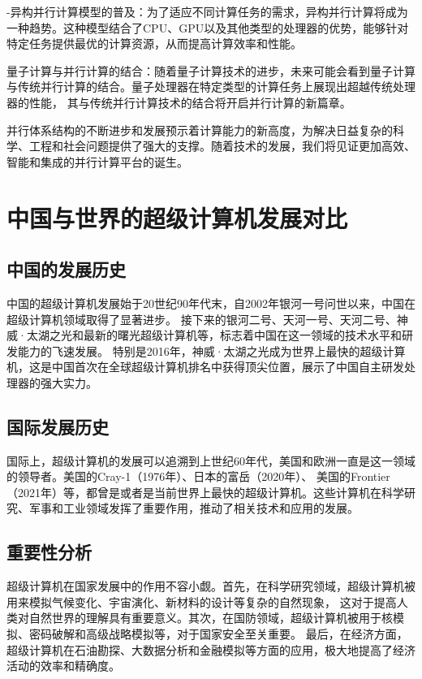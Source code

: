 \documentclass{ctexart}
\begin{document}
-异构并行计算模型的普及：为了适应不同计算任务的需求，异构并行计算将成为一种趋势。这种模型结合了CPU、GPU以及其他类型的处理器的优势，能够针对特定任务提供最优的计算资源，从而提高计算效率和性能。

量子计算与并行计算的结合：随着量子计算技术的进步，未来可能会看到量子计算与传统并行计算的结合。量子处理器在特定类型的计算任务上展现出超越传统处理器的性能，
其与传统并行计算技术的结合将开启并行计算的新篇章。

并行体系结构的不断进步和发展预示着计算能力的新高度，为解决日益复杂的科学、工程和社会问题提供了强大的支撑。随着技术的发展，我们将见证更加高效、智能和集成的并行计算平台的诞生。
\section{中国与世界的超级计算机发展对比}
\subsection{中国的发展历史}
中国的超级计算机发展始于20世纪90年代末，自2002年银河一号问世以来，中国在超级计算机领域取得了显著进步。
接下来的银河二号、天河一号、天河二号、神威·太湖之光和最新的曙光超级计算机等，标志着中国在这一领域的技术水平和研发能力的飞速发展。
特别是2016年，神威·太湖之光成为世界上最快的超级计算机，这是中国首次在全球超级计算机排名中获得顶尖位置，展示了中国自主研发处理器的强大实力。
\subsection{国际发展历史}
国际上，超级计算机的发展可以追溯到上世纪60年代，美国和欧洲一直是这一领域的领导者。美国的Cray-1（1976年）、日本的富岳（2020年）、
美国的Frontier（2021年）等，都曾是或者是当前世界上最快的超级计算机。这些计算机在科学研究、军事和工业领域发挥了重要作用，推动了相关技术和应用的发展。
\subsection{重要性分析}
超级计算机在国家发展中的作用不容小觑。首先，在科学研究领域，超级计算机被用来模拟气候变化、宇宙演化、新材料的设计等复杂的自然现象，
这对于提高人类对自然世界的理解具有重要意义。其次，在国防领域，超级计算机被用于核模拟、密码破解和高级战略模拟等，对于国家安全至关重要。
最后，在经济方面，超级计算机在石油勘探、大数据分析和金融模拟等方面的应用，极大地提高了经济活动的效率和精确度。
\end{document}
